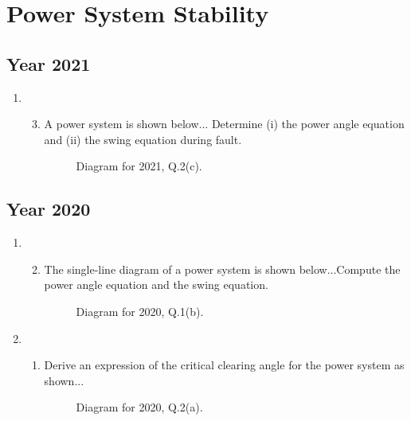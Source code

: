 \documentclass[12pt, a4paper]{article}
\begin{document}
	\section{Power System Stability}
	\subsection{Year 2021}
	\begin{enumerate}[label=\textbf{Q\arabic*.}, wide, labelindent=0pt, start=2]
		\item 
		\begin{enumerate}[label=\textbf{(\alph*)}]
			\setcounter{enumii}{2} %
			\item A power system is shown below... Determine (i) the power angle equation and (ii) the swing equation during fault.
			\begin{figure}[h!]
				\centering
				\caption{Diagram for 2021, Q.2(c).}
			\end{figure}
		\end{enumerate}
	\end{enumerate}
	
	\subsection{Year 2020}
	\begin{enumerate}[label=\textbf{Q\arabic*.}, wide, labelindent=0pt, start=1]
		\item 
		\begin{enumerate}[label=\textbf{(\alph*)}]
			\setcounter{enumii}{1} %
			\item The single-line diagram of a power system is shown below...Compute the power angle equation and the swing equation.
			\begin{figure}[h!]
				\centering
				\caption{Diagram for 2020, Q.1(b).}
			\end{figure}
		\end{enumerate}
		\item
		\begin{enumerate}[label=\textbf{(\alph*)}]
			\item Derive an expression of the critical clearing angle for the power system as shown...
			\begin{figure}[h!]
				\centering
				\caption{Diagram for 2020, Q.2(a).}
			\end{figure}
		\end{enumerate}
	\end{enumerate}
	
\end{document}
